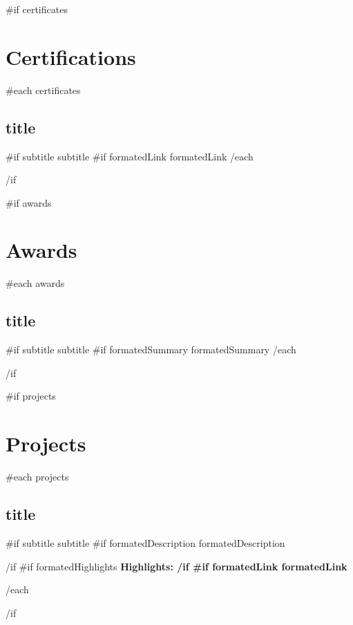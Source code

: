 \documentclass{article}
\begin{document}
{{#if certificates}}\section*{Certifications}{
  {{#each certificates}}
    \subsection*{ {{ title }} } {
      {{#if subtitle}}{{ subtitle }} \ignorespaces
      {{#if formatedLink}}{{ formatedLink }}\ignorespaces
    }
  {{/each}}
}{{/if}}\ignorespaces

{{#if awards}}\section*{Awards}{
  {{#each awards}}
    \subsection*{ {{ title }} } {
      {{#if subtitle}}{{ subtitle }} \ignorespaces
      {{#if formatedSummary}}{{ formatedSummary }}\ignorespaces
    }
  {{/each}}
}{{/if}}\ignorespaces

{{#if projects}}\section*{Projects}{
  {{#each projects}}
    \subsection*{ {{ title }} } {
      {{#if subtitle}}{{ subtitle }} \ignorespaces
      {{#if formatedDescription}}
        {{ formatedDescription }} 
        \par
      {{/if}}\ignorespaces
      {{#if formatedHighlights}}
        \bfseries Highlights: \newline
      {{/if}}\ignorespaces
      {{#if formatedLink}}{{ formatedLink }} \ignorespaces
    }
  {{/each}}
}{{/if}}
\end{document}
